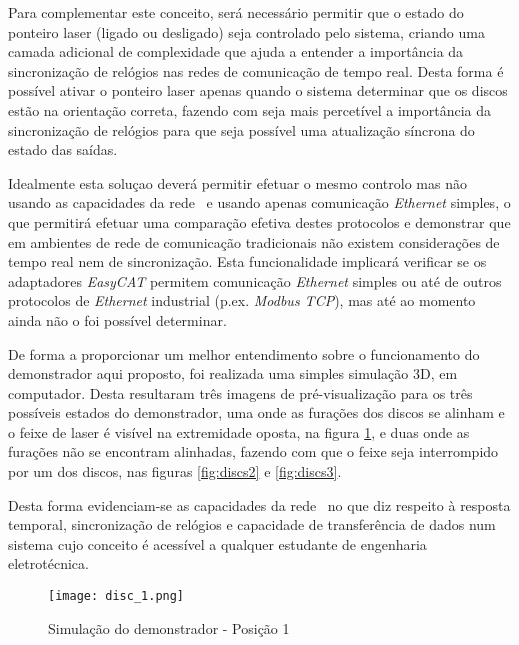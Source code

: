 Para complementar este conceito, será necessário permitir que o estado
do ponteiro laser (ligado ou desligado) seja controlado pelo sistema,
criando uma camada adicional de complexidade que ajuda a entender a
importância da sincronização de relógios nas redes de comunicação de
tempo real. Desta forma é possível ativar o ponteiro laser apenas quando
o sistema  determinar que os discos estão na orientação correta, fazendo
com seja mais percetível a importância da sincronização de relógios para
que seja possível uma atualização síncrona do estado das saídas.

Idealmente esta soluçao deverá permitir efetuar o mesmo controlo mas não
usando as capacidades da rede \ecat\ e usando apenas comunicação
\emph{Ethernet} simples, o que permitirá efetuar uma comparação efetiva
destes protocolos e demonstrar que em ambientes de rede de comunicação
tradicionais não existem considerações de tempo real nem de sincronização.
Esta funcionalidade implicará verificar se os adaptadores \emph{EasyCAT}
permitem comunicação \emph{Ethernet} simples ou até de outros protocolos
de \emph{Ethernet} industrial (p.ex. \emph{Modbus TCP}), mas até ao momento
ainda não o foi possível determinar.

De forma a proporcionar um melhor entendimento sobre o funcionamento do
demonstrador aqui proposto, foi realizada uma simples simulação 3D, em
computador. Desta resultaram três imagens de pré-visualização para os
três possíveis estados do demonstrador, uma onde as furações dos discos
se alinham e o feixe de laser é visível na extremidade oposta, na figura
\ref{fig:discs1}, e duas onde as furações não se encontram alinhadas,
fazendo com que o feixe seja interrompido por um dos discos, nas figuras
\ref{fig:discs2} e \ref{fig:discs3}.

Desta forma evidenciam-se as capacidades da rede \ecat\ no que diz
respeito à resposta temporal, sincronização de relógios e capacidade de
transferência de dados num sistema cujo conceito é acessível a qualquer
estudante de engenharia eletrotécnica.

\begin{figure}[htp]
 \centering
 \texttt{[image: disc\_1.png]}
 \caption{Simulação do demonstrador - Posição 1}
 \label{fig:discs1}
\end{figure}

